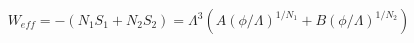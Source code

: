 \begin{equation}
W_{eff} = -( N_1S_1+N_2S_2) = \Lambda^3(A(\phi/\Lambda)^{1/N_1} + B(\phi/\Lambda)^{1/N_2})
\end{equation}

